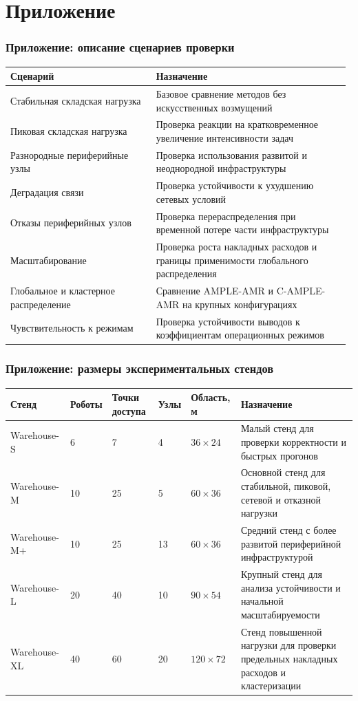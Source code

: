 \section{Приложение}

\begin{frame}
	\frametitle{Приложение: описание сценариев проверки}
	\setlength{\tabcolsep}{1.5pt}
	\small
	\begin{tabular}{p{0.42\linewidth}p{0.56\linewidth}}
		\toprule
		\textbf{Сценарий} & \textbf{Назначение} \\
		\midrule
		Стабильная складская нагрузка & Базовое сравнение методов без искусственных возмущений \\
		Пиковая складская нагрузка & Проверка реакции на кратковременное увеличение интенсивности задач \\
		Разнородные периферийные узлы & Проверка использования развитой и неоднородной инфраструктуры \\
		Деградация связи & Проверка устойчивости к ухудшению сетевых условий \\
		Отказы периферийных узлов & Проверка перераспределения при временной потере части инфраструктуры \\
		Масштабирование & Проверка роста накладных расходов и границы применимости глобального распределения \\
		Глобальное и кластерное распределение & Сравнение AMPLE-AMR и C-AMPLE-AMR на крупных конфигурациях \\
		Чувствительность к режимам & Проверка устойчивости выводов к коэффициентам операционных режимов \\
	\end{tabular}
\end{frame}

\begin{frame}
	\frametitle{Приложение: размеры экспериментальных стендов}
	\setlength{\tabcolsep}{1.5pt}
	\scriptsize
	\begin{tabular}{|p{}|p{}|p{}|p{}|p{}|p{}|}
		\hline
		\textbf{Стенд} & \textbf{Роботы} & \textbf{Точки доступа} & \textbf{Узлы} & \textbf{Область, м} & \textbf{Назначение} \\
		\hline
		Warehouse-S & 6 & 7 & 4 & $36 \times 24$ & Малый стенд для проверки корректности и быстрых прогонов \\
		\hline
		Warehouse-M & 10 & 25 & 5 & $60 \times 36$ & Основной стенд для стабильной, пиковой, сетевой и отказной нагрузки \\
		\hline
		Warehouse-M+ & 10 & 25 & 13 & $60 \times 36$ & Средний стенд с более развитой периферийной инфраструктурой \\
		\hline
		Warehouse-L & 20 & 40 & 10 & $90 \times 54$ & Крупный стенд для анализа устойчивости и начальной масштабируемости \\
		\hline
		Warehouse-XL & 40 & 60 & 20 & $120 \times 72$ & Стенд повышенной нагрузки для проверки предельных накладных расходов и кластеризации \\
		\hline
	\end{tabular}
\end{frame}

